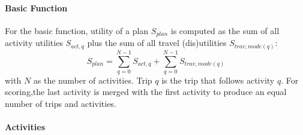 \paragraph{Basic Function}

For the basic function, utility of a plan $S_{plan}$ is computed as the sum of all activity utilities $S_{act,q}$ plus the sum of all travel (dis)utilities $S_{trav,mode(q)}$:
%
\begin{equation}
\label{eq:matsimUTF}
S_{plan}=\sum^{N-1}_{q=0} S_{act,q} + \sum^{N-1}_{q=0} S_{trav,mode(q)}
\end{equation}
with $N$ as the number of activities. Trip $q$ is the trip that follows activity $q$. For scoring,the last activity is  merged with the first activity to produce an equal number of trips and activities.

\paragraph{Activities}

